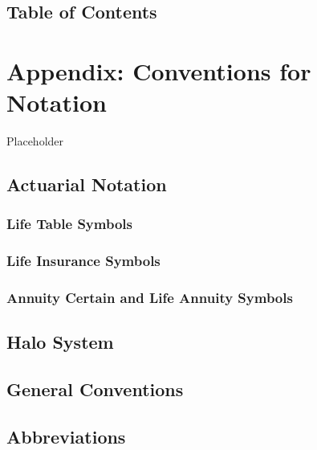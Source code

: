 \documentclass[
]{book}
\begin{document}
\hypertarget{table-of-contents}{%
\section{Table of Contents}\label{table-of-contents}}

\hypertarget{C:NotationConventionLC}{%
\chapter{Appendix: Conventions for Notation}\label{C:NotationConventionLC}}

Placeholder

\hypertarget{S:NC:ActSymbols}{%
\section{Actuarial Notation}\label{S:NC:ActSymbols}}

\hypertarget{life-table-symbols}{%
\subsection{Life Table Symbols}\label{life-table-symbols}}

\hypertarget{Sec:LifeInsSymbols}{%
\subsection{Life Insurance Symbols}\label{Sec:LifeInsSymbols}}

\hypertarget{Sec:LifeAnnSymbols}{%
\subsection{Annuity Certain and Life Annuity Symbols}\label{Sec:LifeAnnSymbols}}

\hypertarget{C:NotConv:Halo}{%
\section{Halo System}\label{C:NotConv:Halo}}

\hypertarget{S:NC:General}{%
\section{General Conventions}\label{S:NC:General}}

\hypertarget{S:NC:Abbreviations}{%
\section{Abbreviations}\label{S:NC:Abbreviations}}
\end{document}
